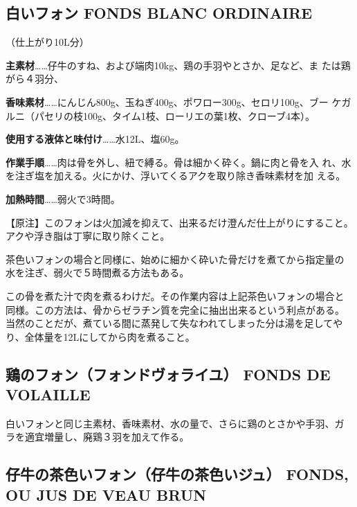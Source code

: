 \documentclass[twoside,12Q,b5paper]{escoffierltjsbook}
\begin{document}
\subsection*{白いフォン FONDS BLANC
ORDINAIRE}\label{ux767dux3044ux30d5ux30a9ux30f3-fonds-blanc-ordinaire}

（仕上がり10L分）

\textbf{主素材}\ldots{}\ldots{}仔牛のすね、および端肉10kg、鶏の手羽やとさか、足など、ま
たは鶏がら４羽分、

\textbf{香味素材}\ldots{}\ldots{}にんじん800g、玉ねぎ400g、ポワロー300g、セロリ100g、ブー
ケガルニ（パセリの枝100g、タイム1枝、ローリエの葉1枚、クローブ4本）。

\textbf{使用する液体と味付け}\ldots{}\ldots{}水12L、塩60g。

\textbf{作業手順}\ldots{}\ldots{}肉は骨を外し、紐で縛る。骨は細かく砕く。鍋に肉と骨を入
れ、水を注ぎ塩を加える。火にかけ、浮いてくるアクを取り除き香味素材を加
える。

\textbf{加熱時間}\ldots{}\ldots{}弱火で3時間。

【原注】このフォンは火加減を抑えて、出来るだけ澄んだ仕上がりにすること。
アクや浮き脂は丁寧に取り除くこと。

茶色いフォンの場合と同様に、始めに細かく砕いた骨だけを煮てから指定量の
水を注ぎ、弱火で５時間煮る方法もある。

この骨を煮た汁で肉を煮るわけだ。その作業内容は上記茶色いフォンの場合と
同様。この方法は、骨からゼラチン質を完全に抽出出来るという利点がある。
当然のことだが、煮ている間に蒸発して失なわれてしまった分は湯を足してや
り、全体量を12Lにしてから肉を煮ること。

\subsection*{鶏のフォン（フォンドヴォライユ） FONDS DE
VOLAILLE}\label{ux9d8fux306eux30d5ux30a9ux30f3ux30d5ux30a9ux30f3ux30c9ux30f4ux30a9ux30e9ux30a4ux30e6-fonds-de-volaille}

白いフォンと同じ主素材、香味素材、水の量で、さらに鶏のとさかや手羽、ガ
ラを適宜増量し、廃鶏３羽を加えて作る。

\subsection*{仔牛の茶色いフォン（仔牛の茶色いジュ） FONDS, OU JUS DE
VEAU
BRUN}\label{ux4ed4ux725bux306eux8336ux8272ux3044ux30d5ux30a9ux30f3ux4ed4ux725bux306eux8336ux8272ux3044ux30b8ux30e5-fonds-ou-jus-de-veau-brun}
\end{document}
